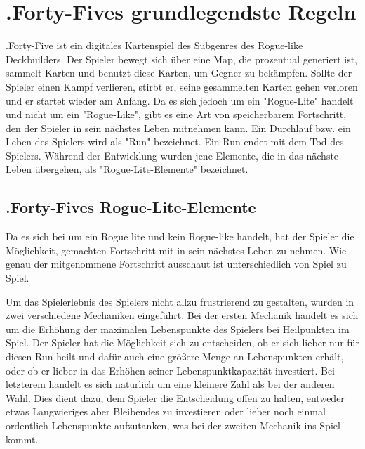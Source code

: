 
\section{.Forty-Fives grundlegendste Regeln}\label{sec:grundlegenste-regeln}

\renewcommand{\kapitelautor}{Autor: Philip Jankovic} %

%
.Forty-Five ist ein digitales Kartenspiel des Subgenres des Rogue-like Deckbuilders. %
Der Spieler bewegt sich über eine Map, die prozentual generiert ist, sammelt Karten und benutzt diese Karten,
um Gegner zu bekämpfen. Sollte der Spieler einen Kampf verlieren, stirbt er, seine gesammelten Karten
gehen verloren und er startet wieder am Anfang. Da es sich jedoch um ein "Rogue-Lite" handelt und nicht um ein "Rogue-Like",
gibt es eine Art von speicherbarem Fortschritt, den der Spieler in sein nächstes Leben mitnehmen kann.
Ein Durchlauf bzw. ein Leben des Spielers wird als "Run" bezeichnet. Ein Run endet mit dem Tod des Spielers.
Während der Entwicklung wurden jene Elemente, die in das nächste Leben übergehen, als "Rogue-Lite-Elemente" bezeichnet.
\cite{roguelikedeckbuilder}



\subsection{.Forty-Fives Rogue-Lite-Elemente}\label{rogue_lite_elemente}

Da es sich bei \FF um ein Rogue lite und kein Rogue-like handelt, hat der Spieler die Möglichkeit, gemachten Fortschritt mit in sein nächstes Leben zu nehmen.
Wie genau der mitgenommene Fortschritt ausschaut ist unterschiedlich von Spiel zu Spiel.\cite{roguelite}


Um das Spielerlebnis des Spielers nicht allzu frustrierend zu gestalten, wurden in \FF zwei verschiedene Mechaniken eingeführt.
Bei der ersten Mechanik handelt es sich um die Erhöhung der maximalen Lebenspunkte des Spielers bei Heilpunkten im Spiel. Der Spieler hat die Möglichkeit
sich zu entscheiden, ob er sich lieber nur für diesen Run heilt und dafür auch eine größere Menge an Lebenspunkten erhält, oder ob er
lieber in das Erhöhen seiner Lebenspunktkapazität investiert. Bei letzterem handelt es sich natürlich um eine kleinere Zahl als bei der anderen Wahl.
Dies dient dazu, dem Spieler die Entscheidung offen zu halten, entweder etwas Langwieriges aber Bleibendes zu investieren oder lieber noch einmal ordentlich
Lebenspunkte aufzutanken, was bei der zweiten Mechanik ins Spiel kommt.

